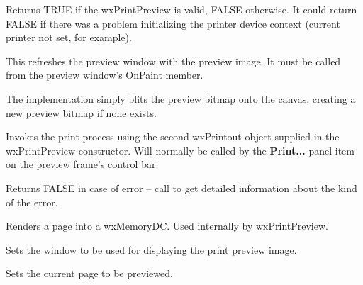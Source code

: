 \label{wxprintpreviewok}


Returns TRUE if the wxPrintPreview is valid, FALSE otherwise. It could return FALSE if there was a
problem initializing the printer device context (current printer not set, for example).

\label{wxprintpreviewpaintpage}


This refreshes the preview window with the preview image.
It must be called from the preview window's OnPaint member.

The implementation simply blits the preview bitmap onto
the canvas, creating a new preview bitmap if none exists.

\label{wxprintpreviewprint}


Invokes the print process using the second wxPrintout object
supplied in the wxPrintPreview constructor.
Will normally be called by the {\bf Print...} panel item on the
preview frame's control bar.

Returns FALSE in case of error -- call
 to get detailed
information about the kind of the error.

\label{wxprintpreviewrenderpage}


Renders a page into a wxMemoryDC. Used internally by wxPrintPreview.

\label{wxprintpreviewsetcanvas}


Sets the window to be used for displaying the print preview image.

\label{wxprintpreviewsetcurrentpage}


Sets the current page to be previewed.

\label{wxprintpreviewsetframe}


